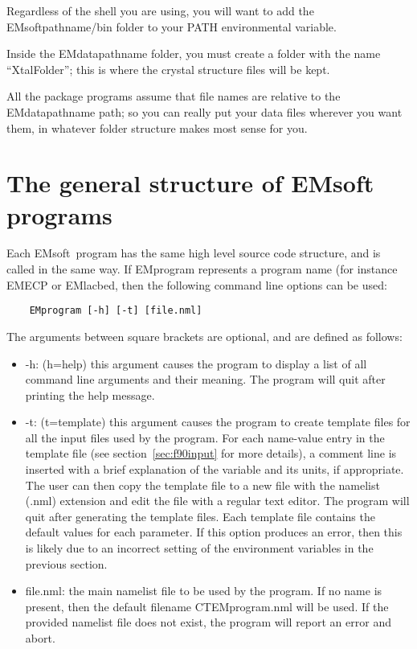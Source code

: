 \documentclass[DIV=calc, paper=letter, fontsize=11pt]{scrartcl}	 %
\newcommand{\ctp}{\textsf{EMsoft}}
\begin{document}
Regardless of the shell you are using, you will want to add the EMsoftpathname/bin folder to your PATH environmental variable.


Inside the EMdatapathname folder, you must create a folder with the name ``XtalFolder''; this is where the 
crystal structure files will be kept.

All the package programs assume that file names are relative to the EMdatapathname path; so you can really put
your data files wherever you want them, in whatever folder structure makes most sense for you.



\newpage
\section{The general structure of EMsoft programs\label{sec:structure}}
Each \ctp\ program has the same high level source code structure, and is called in the same way.  If \textsf{EMprogram} represents 
a program name (for instance \textsf{EMECP} or \textsf{EMlacbed}, then the following command line options can be used:
\begin{verbatim}
	EMprogram [-h] [-t] [file.nml]
\end{verbatim}
The arguments  between square brackets are optional, and are defined as follows:
\begin{itemize}
	\item \textsf{-h}: (h=help) this argument causes the program to display a list of all command line arguments and their meaning.  The program will quit after printing 
	the help message.
	\item \textsf{-t}: (t=template) this argument causes the program to create template files for all the input files used by the program.  For each
	name-value entry in the template file (see section~\ref{sec:f90input} for more details), a comment line is inserted with a brief explanation 
	of the variable and its units, if appropriate.  The user can then copy the template file to a new file with the namelist (.nml) extension and edit the 
	file with a regular text editor.  The program will quit after generating the template files.  Each template file contains the default values for each parameter.
	If this option produces an error, then this is likely due to an incorrect setting of the environment variables in the previous section.
	\item \textsf{file.nml}: the main namelist file to be used by the program.  If no name is present, then the default filename CTEMprogram.nml will be used.  If the 
	provided namelist file does not exist, the program will report an error and abort.
\end{itemize}
\end{document}
